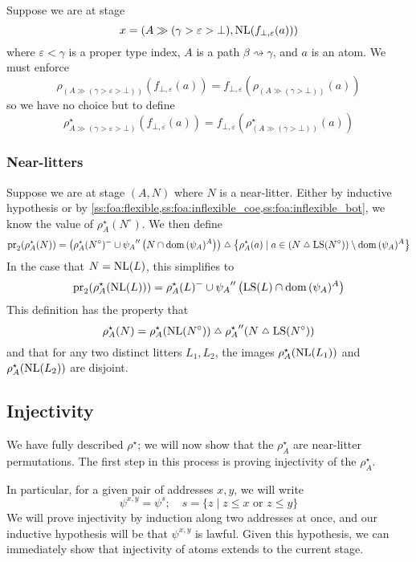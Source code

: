 Suppose we are at stage
\[ x = (A \gg (\gamma > \varepsilon > \bot), \operatorname{NL}(f_{\bot,\varepsilon}(a))) \]
where \( \varepsilon < \gamma \) is a proper type index, \( A \) is a path \( \beta \rightsquigarrow \gamma \), and \( a \) is an atom.
We must enforce
\[ \rho_{(A \gg (\gamma > \varepsilon > \bot))}(f_{\bot,\varepsilon}(a)) = f_{\bot,\varepsilon}(\rho_{(A \gg (\gamma > \bot))}(a)) \]
so we have no choice but to define
\[ \rho^\star_{A \gg (\gamma > \varepsilon > \bot)}(f_{\bot,\varepsilon}(a)) = f_{\bot,\varepsilon}(\rho^\star_{(A \gg (\gamma > \bot))}(a)) \]

\subsubsection{Near-litters}

Suppose we are at stage \( (A, N) \) where \( N \) is a near-litter.
Either by inductive hypothesis or by \cref{ss:foa:flexible,ss:foa:inflexible_coe,ss:foa:inflexible_bot}, we know the value of \( \rho^\star_A(N^\circ) \).
We then define
\[ \pr_2 (\rho^\star_A(N)) = \left( \rho^\star_A(N^\circ)^- \cup {\psi_A} '' \left(N \cap \dom{(\psi_A)^A}\right) \right) \symmdiff \left\{ \rho^\star_A(a) \mid a \in (N \symmdiff \LS(N^\circ)) \setminus \dom{(\psi_A)^A} \right\} \]
In the case that \( N = \operatorname{NL}(L) \), this simplifies to
\[ \operatorname{pr}_2 (\rho^\star_A(\operatorname{NL}(L))) = \rho^\star_A(L)^- \cup {\psi_A} '' \left(\operatorname{LS}(L) \cap \operatorname{dom}{(\psi_A)^A}\right) \]
This definition has the property that
\[ \rho^\star_A(N) = \rho^\star_A(\NL(N^\circ)) \symmdiff {\rho^\star_A} '' (N \symmdiff \LS(N^\circ)) \]
and that for any two distinct litters \( L_1, L_2 \), the images \( \rho^\star_A(\operatorname{NL}(L_1)) \) and \( \rho^\star_A(\operatorname{NL}(L_2)) \) are disjoint.

\subsection{Injectivity}

We have fully described \( \rho^\star \); we will now show that the \( \rho^\star_A \) are near-litter permutations.
The first step in this process is proving injectivity of the \( \rho^\star_A \).

In particular, for a given pair of addresses \( x, y \), we will write
\[ \psi^{x,y} = \psi^s;\quad s = \{z \mid z \leq x \text{ or } z \leq y\} \]
We will prove injectivity by induction along two addresses at once, and our inductive hypothesis will be that \( \psi^{x,y} \) is lawful.
Given this hypothesis, we can immediately show that injectivity of atoms extends to the current stage.

